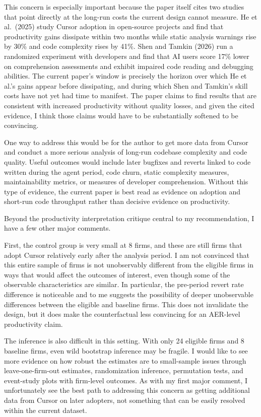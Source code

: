 \documentclass{article}
\begin{document}
This concern is especially important because the paper itself cites two studies that point directly at the long-run costs the current design cannot measure.
He et al.\ (2025) study Cursor adoption in open-source projects and find that productivity gains dissipate within two months while static analysis warnings rise by 30\% and code complexity rises by 41\%.
Shen and Tamkin (2026) run a randomized experiment with developers and find that AI users score 17\% lower on comprehension assessments and exhibit impaired code reading and debugging abilities.
The current paper's window is precisely the horizon over which He et al.'s gains appear before dissipating, and during which Shen and Tamkin's skill costs have not yet had time to manifest.
The paper claims to find results that are consistent with increased productivity without quality losses, and given the cited evidence, I think those claims would have to be substantially softened to be convincing.

One way to address this would be for the author to get more data from Cursor and conduct a more serious analysis of long-run codebase complexity and code quality.
Useful outcomes would include later bugfixes and reverts linked to code written during the agent period, code churn, static complexity measures, maintainability metrics, or measures of developer comprehension.
Without this type of evidence, the current paper is best read as evidence on adoption and short-run code throughput rather than decisive evidence on productivity.

Beyond the productivity interpretation critique central to my recommendation, I have a few other major comments.

First, the control group is very small at 8 firms, and these are still firms that adopt Cursor relatively early after the analysis period.
I am not convinced that this entire sample of firms is not unobservably different from the eligible firms in ways that would affect the outcomes of interest, even though some of the observable characteristics are similar.
In particular, the pre-period revert rate difference is noticeable and to me suggests the possibility of deeper unobservable differences between the eligible and baseline firms.
This does not invalidate the design, but it does make the counterfactual less convincing for an AER-level productivity claim.

The inference is also difficult in this setting.
With only 24 eligible firms and 8 baseline firms, even wild bootstrap inference may be fragile.
I would like to see more evidence on how robust the estimates are to small-sample issues through leave-one-firm-out estimates, randomization inference, permutation tests, and event-study plots with firm-level outcomes.
As with my first major comment, I unfortunately see the best path to addressing this concern as getting additional data from Cursor on later adopters, not something that can be easily resolved within the current dataset.
\end{document}
